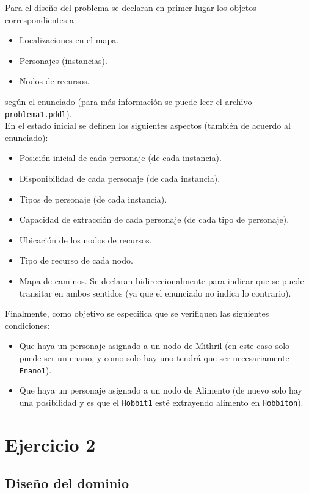\documentclass[10pt]{article}
\begin{document}
Para el diseño del problema se declaran en primer lugar los objetos correspondientes a
\begin{itemize}[label=-]
    \item Localizaciones en el mapa.
    \item Personajes (instancias).
    \item Nodos de recursos.
\end{itemize}
según el enunciado (para más información se puede leer el archivo \texttt{problema1.pddl}). \\

En el estado inicial se definen los siguientes aspectos (también de acuerdo al enunciado):
\begin{itemize}[label=-]
    \item Posición inicial de cada personaje (de cada instancia).
    \item Disponibilidad de cada personaje (de cada instancia).
    \item Tipos de personaje (de cada instancia).
    \item Capacidad de extracción de cada personaje (de cada tipo de personaje).
    \item Ubicación de los nodos de recursos.
    \item Tipo de recurso de cada nodo.
    \item Mapa de caminos. Se declaran bidireccionalmente para indicar que se puede transitar en ambos sentidos (ya que el enunciado no indica lo contrario).
\end{itemize}

Finalmente, como objetivo se especifica que se verifiquen las siguientes condiciones:
\begin{itemize}[label=-]
    \item Que haya un personaje asignado a un nodo de Mithril (en este caso solo puede ser un enano, y como solo hay uno tendrá que ser necesariamente \texttt{Enano1}).
    \item Que haya un personaje asignado a un nodo de Alimento (de nuevo solo hay una posibilidad y es que el \texttt{Hobbit1} esté extrayendo alimento en \texttt{Hobbiton}).
\end{itemize}

\section{Ejercicio 2}

\subsection{Diseño del dominio}
\end{document}
